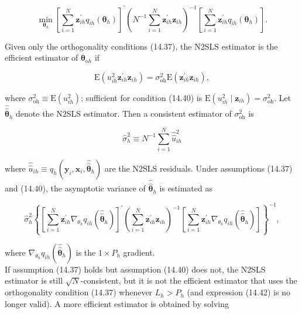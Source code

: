 \documentclass[10pt]{article}
\begin{document}
\begin{equation*}
\min _{\boldsymbol{\theta}_{h}}\left[\sum_{i=1}^{N} \mathbf{z}_{i h}^{\prime} q_{i h}\left(\boldsymbol{\theta}_{h}\right)\right]^{\prime}\left(N^{-1} \sum_{i=1}^{N} \mathbf{z}_{i h}^{\prime} \mathbf{z}_{i h}\right)^{-1}\left[\sum_{i=1}^{N} \mathbf{z}_{i h}^{\prime} q_{i h}\left(\boldsymbol{\theta}_{h}\right)\right] . \tag{14.39}
\end{equation*}


Given only the orthogonality conditions (14.37), the N2SLS estimator is the efficient estimator of $\boldsymbol{\theta}_{\mathrm{o} h}$ if


\begin{equation*}
\mathrm{E}\left(u_{i h}^{2} \mathbf{z}_{i h}^{\prime} \mathbf{z}_{i h}\right)=\sigma_{\mathrm{oh}}^{2} \mathrm{E}\left(\mathbf{z}_{i h}^{\prime} \mathbf{z}_{i h}\right), \tag{14.40}
\end{equation*}


where $\sigma_{\mathrm{oh}}^{2} \equiv \mathrm{E}\left(u_{i h}^{2}\right)$; sufficient for condition (14.40) is $\mathrm{E}\left(u_{i h}^{2} \mid \mathbf{z}_{i h}\right)=\sigma_{\mathrm{oh}}^{2}$. Let $\hat{\hat{\boldsymbol{\theta}}}_{h}$ denote the N2SLS estimator. Then a consistent estimator of $\sigma_{\mathrm{oh}}^{2}$ is


\begin{equation*}
\hat{\sigma}_{h}^{2} \equiv N^{-1} \sum_{i=1}^{N} \hat{\hat{u}}_{i h}^{2} \tag{14.41}
\end{equation*}


where $\hat{\hat{u}}_{i h} \equiv q_{h}\left(\mathbf{y}_{i}, \mathbf{x}_{i}, \hat{\hat{\boldsymbol{\theta}}}_{h}\right)$ are the N2SLS residuals. Under assumptions (14.37) and (14.40), the asymptotic variance of $\hat{\hat{\boldsymbol{\theta}}}_{h}$ is estimated as


\begin{equation*}
\hat{\sigma}_{h}^{2}\left\{\left[\sum_{i=1}^{N} \mathbf{z}_{i h}^{\prime} \nabla_{\theta_{h}} q_{i h}\left(\hat{\hat{\boldsymbol{\theta}}}_{h}\right)\right]^{\prime}\left(\sum_{i=1}^{N} \mathbf{z}_{i h}^{\prime} \mathbf{z}_{i h}\right)^{-1}\left[\sum_{i=1}^{N} \mathbf{z}_{i h}^{\prime} \nabla_{\theta_{h}} q_{i h}\left(\hat{\hat{\boldsymbol{\theta}}}_{h}\right)\right]\right\}^{-1}, \tag{14.42}
\end{equation*}


where $\nabla_{\theta_{h}} q_{i h}\left(\hat{\hat{\boldsymbol{\theta}}}_{h}\right)$ is the $1 \times P_{h}$ gradient.\\
If assumption (14.37) holds but assumption (14.40) does not, the N2SLS estimator is still $\sqrt{N}$-consistent, but it is not the efficient estimator that uses the orthogonality condition (14.37) whenever $L_{h}>P_{h}$ (and expression (14.42) is no longer valid). A more efficient estimator is obtained by solving
\end{document}
